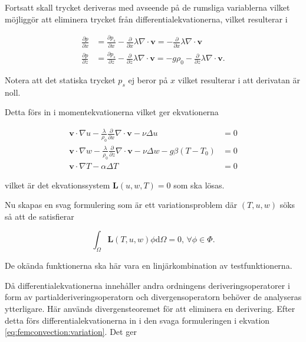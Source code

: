 Fortsatt skall trycket deriveras med avseende på de rumsliga variablerna vilket möjliggör
att eliminera trycket från differentialekvationerna, vilket resulterar i

\begin{align}
\label{eq:femconvection:partx}
\frac{\partial p}{\partial x} &= \frac{\partial p_s}{\partial x} -
\frac{\partial}{\partial x} \lambda\nabla\cdot\mathbf{v} = -
\frac{\partial}{\partial x} \lambda\nabla\cdot\mathbf{v}
\\
\label{eq:femconvection:partz}
\frac{\partial p}{\partial z} &= \frac{\partial p_s}{\partial z} -
\frac{\partial}{\partial z} \lambda\nabla\cdot\mathbf{v} =
-g\rho_0 - \frac{\partial}{\partial z} \lambda\nabla\cdot\mathbf{v}.
\end{align}

Notera att det statiska trycket
$p_s$ ej beror på $x$ vilket resulterar i att derivatan är noll.

Detta förs in i momentekvationerna vilket ger ekvationerna

\begin{align}
\label{eq:femconvection:u}
\mathbf{v}\cdot\nabla u -
\frac{\lambda}{\rho_0}\frac{\partial}{\partial x}\nabla\cdot\mathbf{v} -\nu\Delta u &= 0
\\
\label{eq:femconvection:w}
\mathbf{v}\cdot\nabla w -
\frac{\lambda}{\rho_0}\frac{\partial}{\partial z}\nabla\cdot\mathbf{v}
- \nu\Delta w - g\beta(T-T_0) &= 0 \\ 
\label{eq:femconvection:T}
\mathbf{v}\cdot\nabla T - \alpha\Delta T &= 0
\end{align}

vilket är det ekvationssystem $\mathbf{L}(u,w,T) = 0$
som ska lösas.

Nu skapas en svag formulering som är ett variationsproblem där $(T,u,w)$ söks
så att de satisfierar

\begin{equation}
\label{eq:femconvection:variation}
\int_\Omega \mathbf{L}(T,u,w) \phi \mathrm{d}\Omega = 0\mbox{,  } \forall \phi \in \Phi.
\end{equation}

De okända funktionerna ska här vara en linjärkombination av testfunktionerna.

Då differentialekvationerna innehåller andra ordningens deriveringsoperatorer i form av
partialderiveringsoperatorn och divergensoperatorn behöver de analyseras ytterligare.
Här används divergensteoremet för att eliminera en derivering. Efter detta
förs differentialekvationerna in i den svaga formuleringen i ekvation
\eqref{eq:femconvection:variation}.
Det ger

